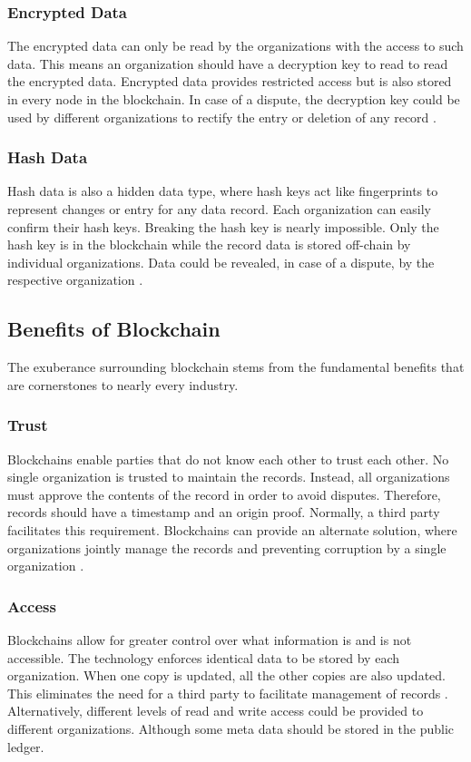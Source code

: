 \documentclass[sigconf]{acmart}
\begin{document}
\subsubsection{Encrypted Data} The encrypted data can only be read by the organizations with the access to such data. This means an organization should have a decryption key to read to read the encrypted data. Encrypted data provides restricted access but is also stored in every node in the blockchain. In case of a dispute, the decryption key could be used by different organizations to rectify the entry or deletion of any record \cite{arbc1}.

\subsubsection{Hash Data} Hash data is also a hidden data type, where hash keys act like fingerprints to represent changes or entry for any data record. Each organization can easily confirm their hash keys. Breaking the hash key is nearly impossible. Only the hash key is in the blockchain while the record data is stored off-chain by individual organizations. Data could be revealed, in case of a dispute, by the respective organization \cite{arbc1}.

\subsection{Benefits of Blockchain}
The exuberance surrounding blockchain stems from the fundamental benefits that are cornerstones to nearly every industry.

\subsubsection{Trust} Blockchains enable parties that do not know each other to trust each other. No single organization is trusted to maintain the records. Instead, all organizations must approve the contents of the record in order to avoid disputes. Therefore, records should have a timestamp and an origin proof. Normally, a third party facilitates this requirement. Blockchains can provide an alternate solution, where organizations jointly manage the records and preventing corruption by a single organization \cite{arbc1}. 

\subsubsection{Access} Blockchains allow for greater control over what information is and is not accessible. The technology enforces identical data to be stored by each organization. When one copy is updated, all the other copies are also updated. This eliminates the need for a third party to facilitate management of records \cite{arbc3}. Alternatively, different levels of read and write access could be provided to different organizations. Although some meta data should be stored in the public ledger. 
\end{document}
